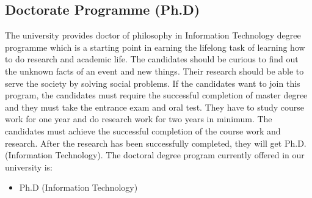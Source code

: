 \documentclass[conference]{IEEEtran}
\begin{document}
\subsection{Doctorate Programme (Ph.D)}
The university provides doctor of philosophy in Information Technology degree programme which is a starting point in earning the lifelong task of learning how to do research and academic life. The candidates should be curious to find out the unknown facts of an event and new things. Their research should be able to serve the society by solving social problems. If the candidates want to join this program, the candidates must require the successful completion of master degree and they must take the entrance exam and oral test. They have to study course work for one year and do research work for two years in minimum. The candidates must achieve the successful completion of the course work and research. After the research has been successfully completed, they will get Ph.D. (Information Technology). The doctoral degree program currently offered in our university is:
\begin{itemize}
\item Ph.D (Information Technology)
\end{itemize}
\end{document}
